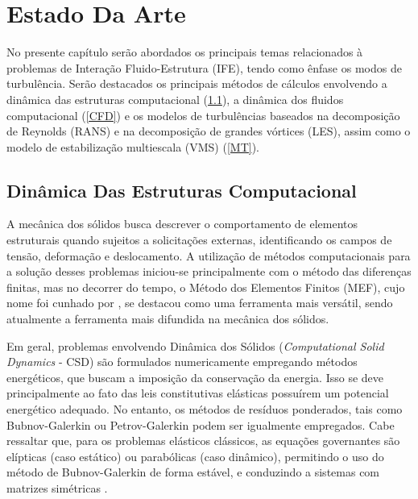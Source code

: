\chapter{Estado Da Arte}

No presente capítulo serão abordados os principais temas relacionados à problemas de Interação Fluido-Estrutura (IFE), tendo como ênfase os modos de turbulência. Serão destacados os principais métodos de cálculos envolvendo a dinâmica das estruturas computacional (\ref{CSD}), a dinâmica dos fluidos computacional (\ref{CFD}) e os modelos de turbulências baseados na decomposição de Reynolds (RANS) e na decomposição de grandes vórtices (LES), assim como o modelo de estabilização multiescala (VMS) (\ref{MT}).

\section{Dinâmica Das Estruturas Computacional} \label{CSD}

A mecânica dos sólidos busca descrever o comportamento de elementos estruturais quando sujeitos a solicitações externas, identificando os campos de tensão, deformação e deslocamento. A utilização de métodos computacionais para a solução desses problemas iniciou-se principalmente com o método das diferenças finitas, mas no decorrer do tempo, o Método dos Elementos Finitos (MEF), cujo nome foi cunhado por , se destacou como uma ferramenta mais versátil, sendo atualmente a ferramenta mais difundida na mecânica dos sólidos.

Em geral, problemas envolvendo Dinâmica dos Sólidos (\textit{Computational Solid Dynamics} - CSD) são formulados numericamente empregando métodos energéticos, que buscam a imposição da conservação da energia. Isso se deve principalmente ao fato das leis constitutivas elásticas possuírem um potencial energético adequado. No entanto, os métodos de resíduos ponderados, tais como Bubnov-Galerkin ou Petrov-Galerkin podem ser igualmente empregados. Cabe ressaltar que, para os problemas elásticos clássicos, as equações governantes são elípticas (caso estático) ou parabólicas (caso dinâmico), permitindo o uso do método de Bubnov-Galerkin de forma estável, e conduzindo a sistemas com matrizes simétricas \cite{de2012nonlinear} \cite{citar livros clássicos do MEF para sólidos. ex: Zienkiewicz}.


